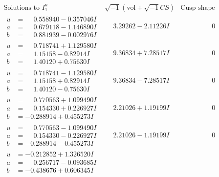 \documentclass[1p]{elsarticle_modified}
\theoremstyle{definition}
\newcommand{\I}{\sqrt{-1}}
\begin{document}
$$\begin{array}{c|c|c}
 \end{array}$$\newpage$$\begin{array}{c|c|c}  
\text{Solutions to }I^u_{1}& \I (\text{vol} + \sqrt{-1}CS) & \text{Cusp shape}\\
 \hline 
\begin{aligned}
u &= \phantom{-}0.558940 - 0.357046 I \\
a &= \phantom{-}0.679118 - 1.146890 I \\
b &= \phantom{-}0.881939 - 0.002976 I\end{aligned}
 & \phantom{-}3.29262 - 2.11226 I & \phantom{-0.000000 } 0 \\ \hline\begin{aligned}
u &= \phantom{-}0.718741 + 1.129580 I \\
a &= \phantom{-}1.15158 - 0.82914 I \\
b &= \phantom{-}1.40120 + 0.75630 I\end{aligned}
 & \phantom{-}9.36834 + 7.28517 I & \phantom{-0.000000 } 0 \\ \hline\begin{aligned}
u &= \phantom{-}0.718741 - 1.129580 I \\
a &= \phantom{-}1.15158 + 0.82914 I \\
b &= \phantom{-}1.40120 - 0.75630 I\end{aligned}
 & \phantom{-}9.36834 - 7.28517 I & \phantom{-0.000000 } 0 \\ \hline\begin{aligned}
u &= \phantom{-}0.770563 + 1.099490 I \\
a &= \phantom{-}0.154330 + 0.226927 I \\
b &= -0.288914 + 0.455273 I\end{aligned}
 & \phantom{-}2.21026 + 1.19199 I & \phantom{-0.000000 } 0 \\ \hline\begin{aligned}
u &= \phantom{-}0.770563 - 1.099490 I \\
a &= \phantom{-}0.154330 - 0.226927 I \\
b &= -0.288914 - 0.455273 I\end{aligned}
 & \phantom{-}2.21026 - 1.19199 I & \phantom{-0.000000 } 0 \\ \hline\begin{aligned}
u &= -0.212852 + 1.326520 I \\
a &= \phantom{-}0.256717 - 0.093685 I \\
b &= -0.438676 + 0.606345 I\end{aligned}

\end{array}$$
\end{document}
